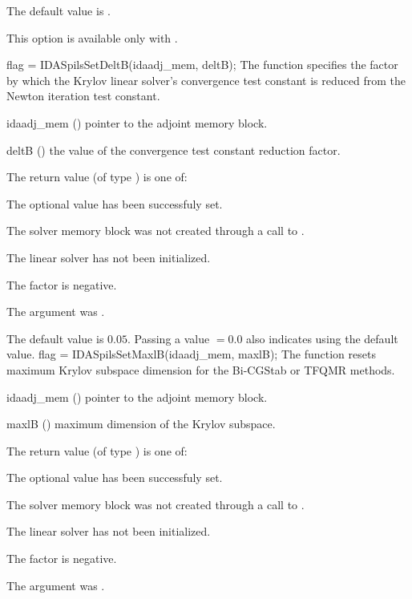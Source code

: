 {
  The default value is .

  {\warn}This option is available only with {\idaspgmr}.
}
{
  flag = IDASpilsSetDeltB(idaadj\_mem, deltB);
}
{
  The function  specifies the factor by
  which the Krylov linear solver's convergence test constant is reduced
  from the Newton iteration test constant.
}
{
  \begin{args}
  \item[idaadj\_mem] ()
    pointer to the adjoint memory block.
  \item[deltB] ()
    the value of the convergence test constant reduction factor.
  \end{args}
}
{
  The return value  (of type ) is one of:
  \begin{args}
  \item[\Id{IDASPILS\_SUCCESS}] 
    The optional value has been successfuly set.
  \item[\Id{IDASPILS\_MEM\_NULL}]
    The {\idas} solver memory block was not created through a call to .
  \item[\Id{IDASPILS\_LMEM\_NULL}]
    The {\idaspgmr} linear solver has not been initialized.
  \item[\Id{IDASPILS\_ILL\_INPUT}]
    The factor  is negative.  
  \item[\Id{IDASPILS\_ADJMEM\_NULL}]
    The  argument was .
  \end{args}
}
{
  The default value is $0.05$.
  Passing a value $ = 0.0$ also indicates using the default value.
}
{
  flag = IDASpilsSetMaxlB(idaadj\_mem, maxlB);
}
{
  The function  resets maximum Krylov subspace
  dimension for the Bi-CGStab or TFQMR 
  methods.
}
{
  \begin{args}
  \item[idaadj\_mem] ()
    pointer to the adjoint memory block.
  \item[maxlB] ()
    maximum dimension of the Krylov subspace.
  \end{args}
}
{
  The return value  (of type ) is one of:
  \begin{args}
  \item[\Id{IDASPILS\_SUCCESS}] 
    The optional value has been successfuly set.
  \item[\Id{IDASPILS\_MEM\_NULL}]
    The {\idas} solver memory block was not created through a call to .
  \item[\Id{IDASPILS\_LMEM\_NULL}]
    The {\idaspgmr} linear solver has not been initialized.
  \item[\Id{IDASPILS\_ILL\_INPUT}]
    The factor  is negative.  
  \item[\Id{IDASPILS\_ADJMEM\_NULL}]
    The  argument was .
  \end{args}
}
